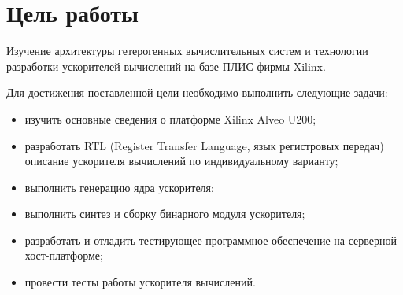 \setcounter{page}{2}
\chapter*{Цель работы}
Изучение архитектуры гетерогенных вычислительных систем и технологии разработки ускорителей вычислений на базе ПЛИС фирмы Xilinx.

Для достижения поставленной цели необходимо выполнить следующие задачи:
\begin{itemize}
	\item изучить основные сведения о платформе Xilinx Alveo U200;
	\item разработать RTL (Register Transfer Language, язык регистровых передач) описание ускорителя вычислений по индивидуальному варианту;
	\item выполнить генерацию ядра ускорителя;
	\item выполнить синтез и сборку бинарного модуля ускорителя;
	\item разработать и отладить тестирующее программное обеспечение на
	серверной хост-платформе;
	\item провести тесты работы ускорителя вычислений.
\end{itemize}